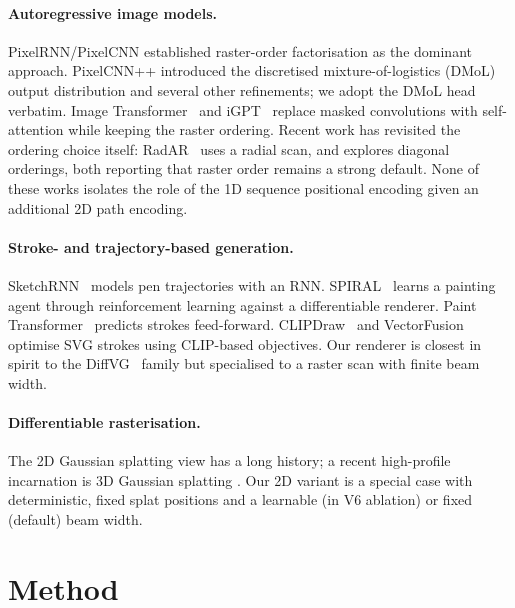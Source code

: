 \documentclass[conference]{IEEEtran}
\begin{document}
\paragraph{Autoregressive image models.}
PixelRNN/PixelCNN \cite{vandenoord2016pixelrnn} established raster-order
factorisation as the dominant approach. PixelCNN++
\cite{salimans2017pixelcnnpp} introduced the discretised mixture-of-logistics
(DMoL) output distribution and several other refinements; we adopt the
DMoL head verbatim. Image Transformer~\cite{parmar2018imagetransformer}
and iGPT~\cite{chen2020generative} replace masked convolutions with
self-attention while keeping the raster ordering. Recent work has
revisited the ordering choice itself: RadAR~\cite{li2025radar} uses
a radial scan, and \cite{li2025direction} explores diagonal orderings,
both reporting that raster order remains a strong default. None of
these works isolates the role of the 1D sequence positional
encoding given an additional 2D path encoding.

\paragraph{Stroke- and trajectory-based generation.}
SketchRNN~\cite{ha2017sketchrnn} models pen trajectories with an RNN.
SPIRAL~\cite{ganin2018spiral} learns a painting agent through
reinforcement learning against a differentiable renderer. Paint
Transformer~\cite{liu2021painttransformer} predicts strokes
feed-forward. CLIPDraw~\cite{frans2021clipdraw} and
VectorFusion~\cite{jain2023vectorfusion} optimise SVG strokes using
CLIP-based objectives. Our renderer is closest in spirit to the
DiffVG~\cite{li2020diffvg} family but specialised to a raster
scan with finite beam width.

\paragraph{Differentiable rasterisation.}
The 2D Gaussian splatting view has a long history; a recent
high-profile incarnation is 3D Gaussian splatting
\cite{kerbl20233dgaussian}. Our 2D variant is a special case with
deterministic, fixed splat positions and a learnable (in V6 ablation)
or fixed (default) beam width.

\section{Method}\label{sec:method}
\end{document}
